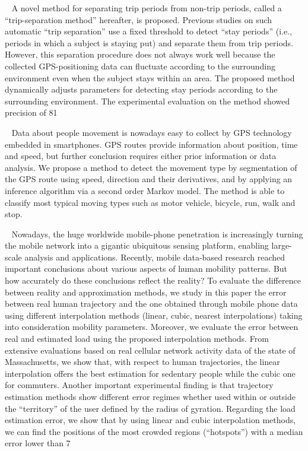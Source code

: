 ~\cite{6958169}
A novel method for separating trip periods from non-trip periods, called a “trip-separation method” hereafter, is proposed. Previous studies on such automatic “trip separation” use a fixed threshold to detect “stay periods” (i.e., periods in which a subject is staying put) and separate them from trip periods. However, this separation procedure does not always work well because the collected GPS-positioning data can fluctuate according to the surrounding environment even when the subject stays within an area. The proposed method dynamically adjusts parameters for detecting stay periods according to the surrounding environment. The experimental evaluation on the method showed precision of 81%

~\cite{6450942}
Data about people movement is nowadays easy to collect by GPS technology embedded in smartphones. GPS routes provide information about position, time and speed, but further conclusion requires either prior information or data analysis. We propose a method to detect the movement type by segmentation of the GPS route using speed, direction and their derivatives, and by applying an inference algorithm via a second order Markov model. The method is able to classify most typical moving types such as motor vehicle, bicycle, run, walk and stop.

~\cite{hoteit2014estimating}
Nowadays, the huge worldwide mobile-phone penetration is increasingly turning the mobile network into a gigantic ubiquitous sensing platform, enabling large-scale analysis and applications. Recently, mobile data-based research reached important conclusions about various aspects of human mobility patterns. But how accurately do these conclusions reflect the reality? To evaluate the difference between reality and approximation methods, we study in this paper the error between real human trajectory and the one obtained through mobile phone data using different interpolation methods (linear, cubic, nearest interpolations) taking into consideration mobility parameters. Moreover, we evaluate the error between real and estimated load using the proposed interpolation methods. From extensive evaluations based on real cellular network activity data of the state of Massachusetts, we show that, with respect to human trajectories, the linear interpolation offers the best estimation for sedentary people while the cubic one for commuters. Another important experimental finding is that trajectory estimation methods show different error regimes whether used within or outside the “territory” of the user defined by the radius of gyration. Regarding the load estimation error, we show that by using linear and cubic interpolation methods, we can find the positions of the most crowded regions (“hotspots”) with a median error lower than 7%

